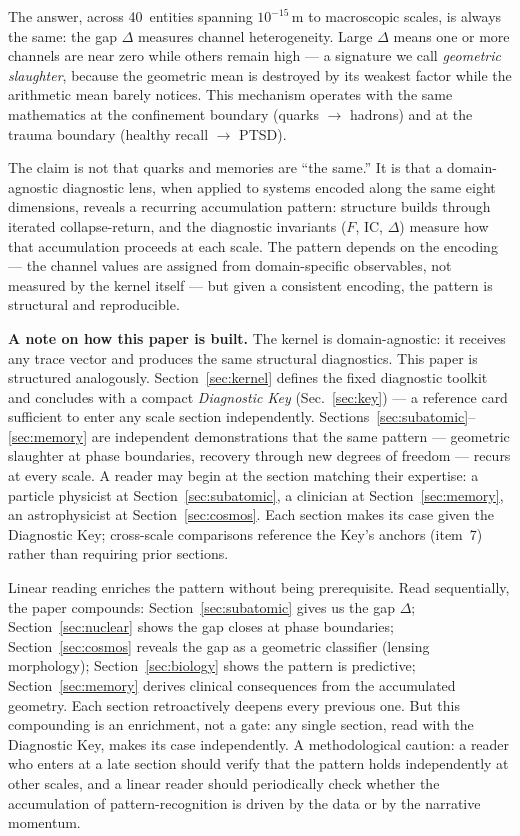 \documentclass[
  aps,
  prd,
  twocolumn,
  superscriptaddress,
  nofootinbib,
  floatfix
]{revtex4-2}
\newcommand{\IC}{\mathrm{IC}}
\begin{document}
The answer, across 40~entities spanning $10^{-15}$\,m to
macroscopic scales, is always the same: the gap $\Delta$
measures channel heterogeneity.  Large $\Delta$ means one or
more channels are near zero while others remain high ---
a signature we call \emph{geometric slaughter}, because the
geometric mean is destroyed by its weakest factor while the
arithmetic mean barely notices.  This mechanism operates with
the same mathematics at the confinement boundary (quarks
$\to$ hadrons) and at the trauma boundary (healthy recall
$\to$ PTSD).

The claim is not that quarks and memories are ``the same.''
It is that a domain-agnostic diagnostic lens, when applied to
systems encoded along the same eight dimensions, reveals a
recurring accumulation pattern: structure builds through
iterated collapse-return, and the diagnostic invariants
($F$, $\IC$, $\Delta$) measure how that accumulation
proceeds at each scale.  The pattern depends on the encoding
--- the channel values are assigned from domain-specific
observables, not measured by the kernel itself --- but
given a consistent encoding, the pattern is structural
and reproducible.

\textbf{A note on how this paper is built.}
The kernel is domain-agnostic: it receives any trace vector
and produces the same structural diagnostics.  This paper is
structured analogously.  Section~\ref{sec:kernel} defines
the fixed diagnostic toolkit and concludes with a compact
\emph{Diagnostic Key} (Sec.~\ref{sec:key}) --- a reference
card sufficient to enter any scale section independently.
Sections~\ref{sec:subatomic}--\ref{sec:memory} are
independent demonstrations that the same pattern ---
geometric slaughter at phase boundaries, recovery through
new degrees of freedom --- recurs at every scale.  A reader
may begin at the section matching their expertise: a
particle physicist at Section~\ref{sec:subatomic}, a
clinician at Section~\ref{sec:memory}, an astrophysicist at
Section~\ref{sec:cosmos}.  Each section makes its case
given the Diagnostic Key; cross-scale comparisons reference
the Key's anchors (item~7) rather than requiring prior
sections.

Linear reading enriches the pattern without being
prerequisite.  Read sequentially, the paper compounds:
Section~\ref{sec:subatomic} gives us the gap $\Delta$;
Section~\ref{sec:nuclear} shows the gap closes at phase
boundaries; Section~\ref{sec:cosmos} reveals the gap as a
geometric classifier (lensing morphology);
Section~\ref{sec:biology} shows the pattern is predictive;
Section~\ref{sec:memory} derives clinical consequences from
the accumulated geometry.  Each section retroactively
deepens every previous one.  But this compounding is an
enrichment, not a gate: any single section, read with the
Diagnostic Key, makes its case independently.
A methodological caution: a reader who enters at a late
section should verify that the pattern holds independently
at other scales, and a linear reader should periodically
check whether the accumulation of pattern-recognition is
driven by the data or by the narrative momentum.
\end{document}
